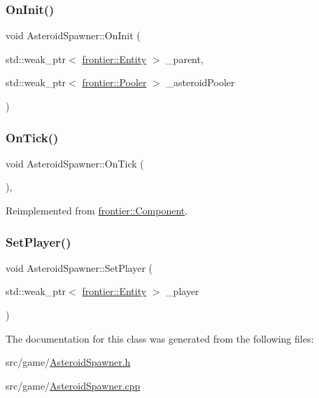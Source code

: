 \subsubsection{\texorpdfstring{On\+Init()}{OnInit()}}
{\footnotesize\ttfamily void Asteroid\+Spawner\+::\+On\+Init (\begin{DoxyParamCaption}\item[{std\+::weak\+\_\+ptr$<$ \hyperlink{classfrontier_1_1_entity}{frontier\+::\+Entity} $>$}]{\+\_\+parent,  }\item[{std\+::weak\+\_\+ptr$<$ \hyperlink{classfrontier_1_1_pooler}{frontier\+::\+Pooler} $>$}]{\+\_\+asteroid\+Pooler }\end{DoxyParamCaption})}

\mbox{\label{class_asteroid_spawner_acd2744a9a1ac8f13ac28220b33b9f750}} 
\subsubsection{\texorpdfstring{On\+Tick()}{OnTick()}}
{\footnotesize\ttfamily void Asteroid\+Spawner\+::\+On\+Tick (\begin{DoxyParamCaption}{ }\end{DoxyParamCaption})\hspace{0.3cm}{\ttfamily [override]}, {\ttfamily [virtual]}}



Reimplemented from \hyperlink{classfrontier_1_1_component_ab920f9bc07ce051ebb5559c5a66508d1}{frontier\+::\+Component}.

\mbox{\label{class_asteroid_spawner_a4ba8146f631d20b3f293f05cb6542da5}} 
\subsubsection{\texorpdfstring{Set\+Player()}{SetPlayer()}}
{\footnotesize\ttfamily void Asteroid\+Spawner\+::\+Set\+Player (\begin{DoxyParamCaption}\item[{std\+::weak\+\_\+ptr$<$ \hyperlink{classfrontier_1_1_entity}{frontier\+::\+Entity} $>$}]{\+\_\+player }\end{DoxyParamCaption})}



The documentation for this class was generated from the following files\+:\begin{DoxyCompactItemize}
\item 
src/game/\hyperlink{_asteroid_spawner_8h}{Asteroid\+Spawner.\+h}\item 
src/game/\hyperlink{_asteroid_spawner_8cpp}{Asteroid\+Spawner.\+cpp}\end{DoxyCompactItemize}
